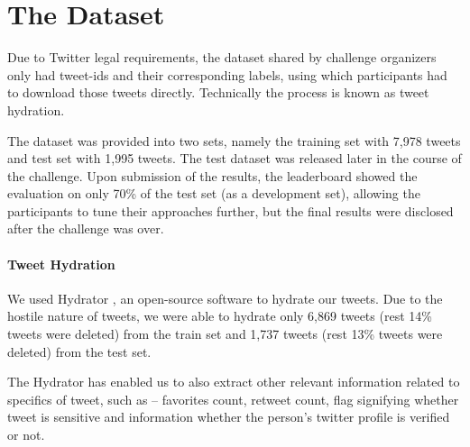 	\section{The Dataset} 
	
	Due to Twitter legal requirements, the dataset \cite{Gautam_Mathur_Gosangi_Mahata_Sawhney_Shah_2020}  shared by challenge organizers only had tweet-ids and their corresponding labels, using which participants had to download those tweets directly. Technically the process is known as tweet hydration.  
	
	The dataset was provided into two sets, namely the training set with 7,978 tweets and test set with 1,995 tweets. The test dataset was released later in the course of the challenge. Upon submission of the results, the leaderboard showed the evaluation on only 70\% of the test set (as a development set), allowing the participants to tune their approaches further, but the final results were disclosed after the challenge was over. 
	
	\paragraph{Tweet Hydration} We used Hydrator \cite{hydrator}, an open-source software to hydrate our tweets. Due to the hostile nature of tweets, we were able to hydrate only 6,869 tweets (rest 14\% tweets were deleted) from the train set and 1,737 tweets (rest 13\% tweets were deleted) from the test set.
	
	The Hydrator has enabled us to also extract other relevant information related to specifics of tweet, such as -- favorites count, retweet count, flag signifying whether tweet is sensitive and information whether the person's twitter profile is verified or not.
	
